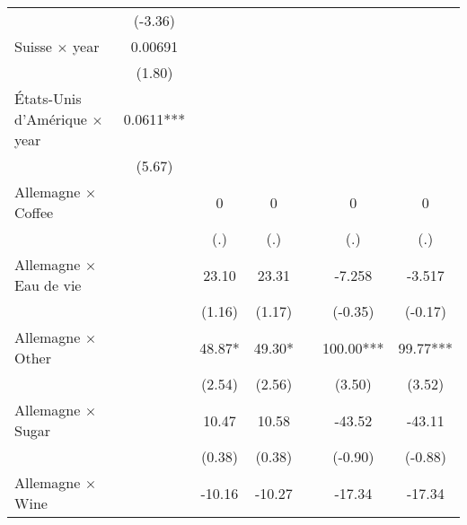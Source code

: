 {\begin{tabular}{l*{6}{c}}
                    &     (-3.36)         &                     &                     &                     &                     &                     \\
[1em]
Suisse $\times$ year&     0.00691         &                     &                     &                     &                     &                     \\
                    &      (1.80)         &                     &                     &                     &                     &                     \\
[1em]
États-Unis d'Amérique $\times$ year&      0.0611***&                     &                     &                     &                     &                     \\
                    &      (5.67)         &                     &                     &                     &                     &                     \\
[1em]
Allemagne $\times$ Coffee&                     &           0         &           0         &                     &           0         &           0         \\
                    &                     &         (.)         &         (.)         &                     &         (.)         &         (.)         \\
[1em]
Allemagne $\times$ Eau de vie&                     &       23.10         &       23.31         &                     &      -7.258         &      -3.517         \\
                    &                     &      (1.16)         &      (1.17)         &                     &     (-0.35)         &     (-0.17)         \\
[1em]
Allemagne $\times$ Other&                     &       48.87*  &       49.30*  &                     &      100.00***&       99.77***\\
                    &                     &      (2.54)         &      (2.56)         &                     &      (3.50)         &      (3.52)         \\
[1em]
Allemagne $\times$ Sugar&                     &       10.47         &       10.58         &                     &      -43.52         &      -43.11         \\
                    &                     &      (0.38)         &      (0.38)         &                     &     (-0.90)         &     (-0.88)         \\
[1em]
Allemagne $\times$ Wine&                     &      -10.16         &      -10.27         &                     &      -17.34         &      -17.34         \\

\end{tabular}}
